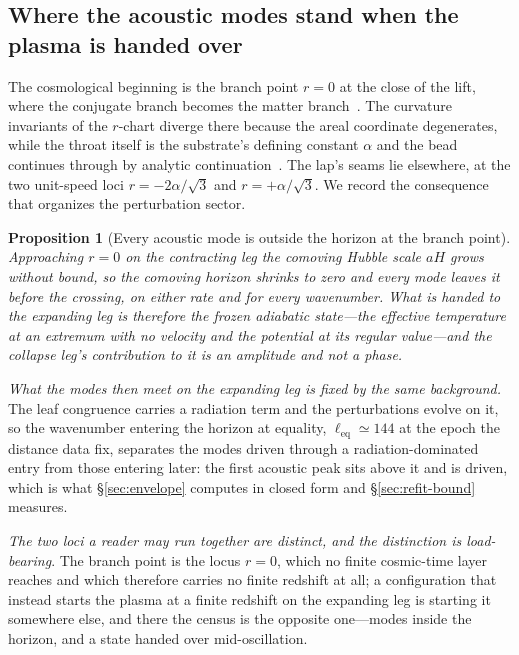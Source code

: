 \documentclass[11pt,a4paper]{article}
\theoremstyle{plain}
\newtheorem{proposition}{Proposition}
\theoremstyle{definition}
\theoremstyle{remark}
\begin{document}
\subsection{Where the acoustic modes stand when the plasma is handed over}
The cosmological beginning is the branch point $r=0$ at the close of the lift, where the conjugate branch becomes the matter branch~\cite{JanzenCRframework,JanzenSlicing}. The curvature invariants of the $r$-chart diverge there because the areal coordinate degenerates, while the throat itself is the substrate's defining constant $\alpha$ and the bead continues through by analytic continuation~\cite{JanzenCircle}. The lap's seams lie elsewhere, at the two unit-speed loci $r=-2\alpha/\sqrt3$ and $r=+\alpha/\sqrt3$. We record the consequence that organizes the perturbation sector.

\begin{proposition}[Every acoustic mode is outside the horizon at the branch point]\label{prop:subhorizon}
Approaching $r=0$ on the contracting leg the comoving Hubble scale $aH$ grows without bound, so the comoving horizon shrinks to zero and every mode leaves it before the crossing, on either rate and for every wavenumber. \emph{What is handed to the expanding leg is therefore the frozen adiabatic state}---the effective temperature at an extremum with no velocity and the potential at its regular value---and the collapse leg's contribution to it is an amplitude and not a phase.
\end{proposition}

\noindent\emph{What the modes then meet on the expanding leg is fixed by the same background.} The leaf congruence carries a radiation term and the perturbations evolve on it, so the wavenumber entering the horizon at equality, $\ell_{\mathrm{eq}}\simeq144$ at the epoch the distance data fix, separates the modes driven through a radiation-dominated entry from those entering later: the first acoustic peak sits above it and is driven, which is what \S\ref{sec:envelope} computes in closed form and \S\ref{sec:refit-bound} measures.

\emph{The two loci a reader may run together are distinct, and the distinction is load-bearing}. The branch point is the locus $r=0$, which no finite cosmic-time layer reaches and which therefore carries no finite redshift at all; a configuration that instead starts the plasma at a finite redshift on the expanding leg is starting it somewhere else, and there the census is the opposite one---modes inside the horizon, and a state handed over mid-oscillation.
\end{document}

